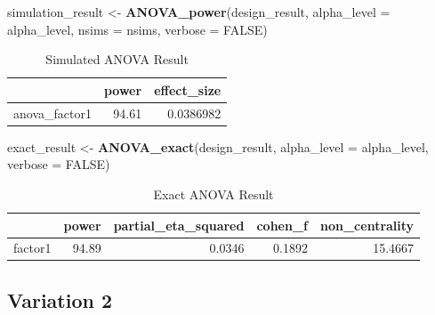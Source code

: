 \documentclass[]{book}
\newenvironment{Shaded}{\begin{snugshade}}{\end{snugshade}}
\newcommand{\DataTypeTok}[1]{\textcolor[rgb]{0.13,0.29,0.53}{#1}}
\newcommand{\KeywordTok}[1]{\textcolor[rgb]{0.13,0.29,0.53}{\textbf{#1}}}
\newcommand{\NormalTok}[1]{#1}
\newcommand{\OtherTok}[1]{\textcolor[rgb]{0.56,0.35,0.01}{#1}}
\newcommand{\StringTok}[1]{\textcolor[rgb]{0.31,0.60,0.02}{#1}}
\begin{document}
\begin{Shaded}
\begin{Highlighting}[]
\NormalTok{simulation_result <-}\StringTok{ }\KeywordTok{ANOVA_power}\NormalTok{(design_result, }
                                 \DataTypeTok{alpha_level =}\NormalTok{ alpha_level, }
                                 \DataTypeTok{nsims =}\NormalTok{ nsims,}
                                 \DataTypeTok{verbose =} \OtherTok{FALSE}\NormalTok{)}
\end{Highlighting}
\end{Shaded}

\begin{table}[!h]

\caption{\label{tab:unnamed-chunk-64}Simulated ANOVA Result}
\centering
\begin{tabular}{l|r|r}
\hline
  & power & effect\_size\\
\hline
anova\_factor1 & 94.61 & 0.0386982\\
\hline
\end{tabular}
\end{table}

\begin{Shaded}
\begin{Highlighting}[]
\NormalTok{exact_result <-}\StringTok{ }\KeywordTok{ANOVA_exact}\NormalTok{(design_result,}
                            \DataTypeTok{alpha_level =}\NormalTok{ alpha_level,}
                            \DataTypeTok{verbose =} \OtherTok{FALSE}\NormalTok{)}
\end{Highlighting}
\end{Shaded}

\begin{table}[!h]

\caption{\label{tab:unnamed-chunk-66}Exact ANOVA Result}
\centering
\begin{tabular}{l|r|r|r|r}
\hline
  & power & partial\_eta\_squared & cohen\_f & non\_centrality\\
\hline
factor1 & 94.89 & 0.0346 & 0.1892 & 15.4667\\
\hline
\end{tabular}
\end{table}

\hypertarget{variation-2}{%
\subsection{Variation 2}\label{variation-2}}
\end{document}
